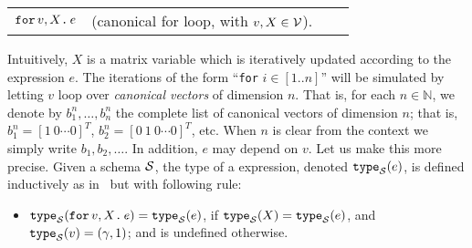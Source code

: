 \begin{tabular}{lcll}
 $\texttt{for}\, v,X \texttt{.}\, e$ & (canonical for loop, with $v, X \in \mathcal{V}$). 
\end{tabular}

\medskip
Intuitively, $X$ is a matrix variable which is iteratively updated according to the expression $e$. The iterations of the form ``\texttt{for} $i\in [1..n]$'' will be simulated by letting $v$ loop over \textit{canonical vectors} of dimension $n$. That is,
for each $n\in \mathbb{N}$, we denote by $b_1^n,\ldots ,b_n^n$ the complete list of canonical vectors of dimension $n$; that is, $b_1^n = [1\ 0 \cdots 0]^T$, $b_2^n = [0\ 1\ 0 \cdots 0]^T$, etc. When $n$ is clear from the context we simply write $b_1,b_2,\ldots$. In addition, $e$ may depend on $v$. Let us make this more precise.
Given a schema $\mathcal{S}$, the type of a \langfor expression, denoted $\texttt{type}_{\mathcal{S}}(e)$, is defined inductively as in \lang\, but with following rule:
\begin{itemize}
\item $\texttt{type}_{\mathcal{S}}(\texttt{for}\, v,X \texttt{.}\, e) = \texttt{type}_{\mathcal{S}}(e)$, if $\texttt{type}_{\mathcal{S}}(X) = \texttt{type}_{\mathcal{S}}(e)$, and $\texttt{type}_{\mathcal{S}}(v) = (\gamma,1)$; and is undefined otherwise.
\end{itemize}


